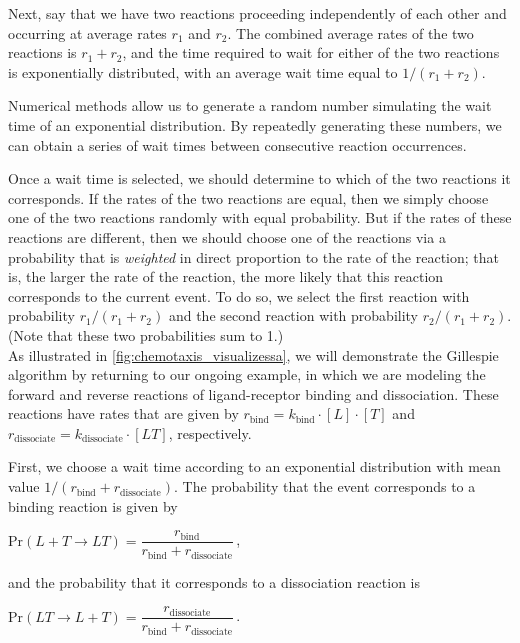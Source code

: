 Next, say that we have two reactions proceeding independently of each other and occurring at average rates $r_1$ and $r_2$. The combined average rates of the two reactions is $r_1 + r_2$, and the time required to wait for either of the two reactions is exponentially distributed, with an average wait time equal to $1/(r_1 + r_2)$.

Numerical methods allow us to generate a random number simulating the wait time of an exponential distribution. By repeatedly generating these numbers, we can obtain a series of wait times between consecutive reaction occurrences.

Once a wait time is selected, we should determine to which of the two reactions it corresponds. If the rates of the two reactions are equal, then we simply choose one of the two reactions randomly with equal probability. But if the rates of these reactions are different, then we should choose one of the reactions via a probability that is \textit{weighted} in direct proportion to the rate of the reaction; that is, the larger the rate of the reaction, the more likely that this reaction corresponds to the current event. To do so, we select the first reaction with probability $r_1/(r_1 + r_2)$ and the second reaction with probability $r_2/(r_1 + r_2)$. (Note that these two probabilities sum to 1.)\\

As illustrated in \autoref{fig:chemotaxis_visualizessa}, we will demonstrate the Gillespie algorithm by returning to our ongoing example, in which we are modeling the forward and reverse reactions of ligand-receptor binding and dissociation. These reactions have rates that are given by $r_\text{bind} = k_\text{bind} \cdot [L] \cdot [T]$ and $r_\text{dissociate} = k_\text{dissociate} \cdot [LT]$, respectively.

First, we choose a wait time according to an exponential distribution with mean value $1/(r_\text{bind} + r_\text{dissociate})$. The probability that the event corresponds to a binding reaction is given by

\begin{center}
$\mathrm{Pr}(L + T \rightarrow LT) = \dfrac{r_\text{bind}}{r_\text{bind} + r_\text{dissociate}}$\,,
\end{center}

\noindent and the probability that it corresponds to a dissociation reaction is

\begin{center}
$\mathrm{Pr}(LT \rightarrow L + T) = \dfrac{r_\text{dissociate}}{r_\text{bind} + r_\text{dissociate}}$\,.
\end{center}

